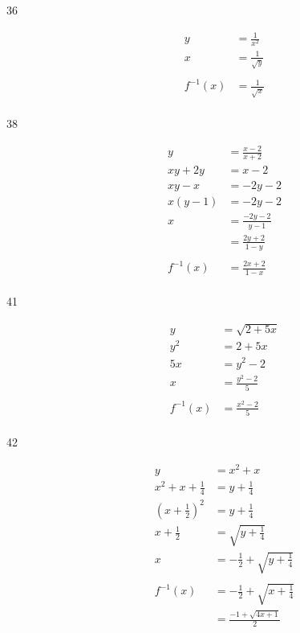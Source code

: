 \documentclass{exam}
\begin{document}
\begin{description}
    \item[36]
      \begin{align*}
        y &= \frac{1}{x^2} \\
        x &= \frac{1}{\sqrt{y}} \\
        \\
        f^{-1}(x) &= \frac{1}{\sqrt{x}} \\
      \end{align*}

    \item[38]
      \begin{align*}
        y        &= \frac{x - 2}{x + 2} \\
        xy + 2y  &= x - 2 \\
        xy - x   &= -2y - 2 \\
        x(y - 1) &= -2y - 2 \\
        x        &= \frac{-2y - 2}{y - 1} \\
                 &= \frac{2y + 2}{1 - y} \\
        \\
        f^{-1}(x) &= \frac{2x + 2}{1 - x} \\
      \end{align*}

    \item[41]
      \begin{align*}
        y &= \sqrt{2 + 5x} \\
        y^2 &= 2 + 5x \\
        5x &= y^2 - 2 \\
        x &= \frac{y^2 - 2}{5} \\
        \\
        f^{-1}(x) &= \frac{x^2 - 2}{5} \\
      \end{align*}

    \item[42]
      \begin{align*}
        y &= x^2 + x \\
        x^2 + x + \frac{1}{4} &= y + \frac{1}{4} \\
        \left( x + \frac{1}{2} \right)^2 &= y + \frac{1}{4} \\
        x + \frac{1}{2} &= \sqrt{y + \frac{1}{4}} \\
        x &= - \frac{1}{2} + \sqrt{y + \frac{1}{4}} \\
        \\
        f^{-1}(x) &= - \frac{1}{2} + \sqrt{x + \frac{1}{4}} \\
          &= \frac{-1 + \sqrt{4x + 1}}{2} \\
      \end{align*}


\end{description}
\end{document}

